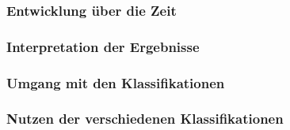 \documentclass[12pt, xcolor=table]{beamer}
\begin{document}
\begin{frame}
	\frametitle{Entwicklung über die Zeit}
\end{frame}
\begin{frame}
	\frametitle{Interpretation der Ergebnisse}
\end{frame}
\begin{frame}
	\frametitle{Umgang mit den Klassifikationen}
\end{frame}
\begin{frame}
	\frametitle{Nutzen der verschiedenen Klassifikationen}
\end{frame}
\end{document}
